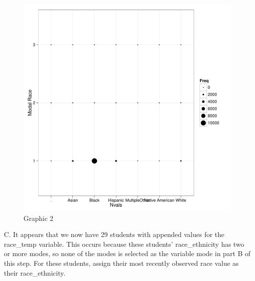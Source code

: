 \documentclass[12pt]{article}
\newenvironment{knitrout}{}{} %
\begin{document}
\begin{knitrout}
\begin{figure}[]
\includegraphics[width=.95\textwidth,height=.2\paperheight]{figure/dotplot} \hfill{}

\caption[Graphic 2]{Graphic 2\label{fig:dotplot}}
\end{figure}

\end{knitrout}



C. It appears that we now have 29 students with appended values for the race\_temp variable. This occurs because these students'
race\_ethnicity has two or more modes, so none of the modes is selected as the variable mode in part B of this step.  For these 
students, assign their most recently observed race value as their race\_ethnicity.
\end{document}
